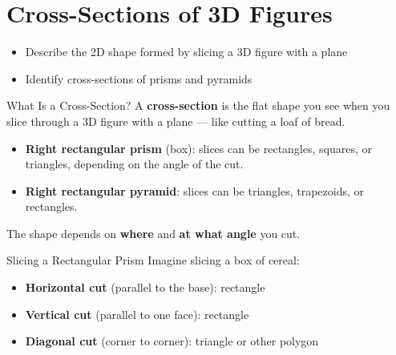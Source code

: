 \section{Cross-Sections of 3D Figures}

\begin{learningGoals}
\begin{itemize}
    \item Describe the 2D shape formed by slicing a 3D figure with a plane
    \item Identify cross-sections of prisms and pyramids
\end{itemize}
\end{learningGoals}

\begin{conceptBox}{What Is a Cross-Section?}
A \textbf{cross-section} is the flat shape you see when you slice through a 3D figure with a plane — like cutting a loaf of bread.
\begin{itemize}[leftmargin=*]
    \item \textbf{Right rectangular prism} (box): slices can be rectangles, squares, or triangles, depending on the angle of the cut.
    \item \textbf{Right rectangular pyramid}: slices can be triangles, trapezoids, or rectangles.
\end{itemize}
The shape depends on \textbf{where} and \textbf{at what angle} you cut.
\end{conceptBox}

\begin{workedExample}{Slicing a Rectangular Prism}
Imagine slicing a box of cereal:
\begin{itemize}[leftmargin=*]
    \item \textbf{Horizontal cut} (parallel to the base): rectangle
    \item \textbf{Vertical cut} (parallel to one face): rectangle
    \item \textbf{Diagonal cut} (corner to corner): triangle or other polygon
\end{itemize}
\end{workedExample}


